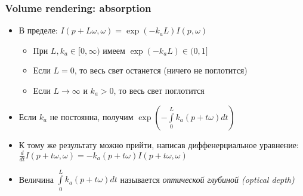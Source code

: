 \documentclass{beamer}
\begin{document}
\begin{frame}[fragile]
\frametitle{Volume rendering: absorption}
\begin{itemize}
\item В пределе: \begin{math}I(p + L\omega, \omega) = \exp(- k_a L) I(p, \omega)\end{math}
\pause
\begin{itemize}
\item При \begin{math}L, k_a \in [0, \infty)\end{math} имеем \begin{math}\exp(-k_a L) \in (0, 1]\end{math}
\item Если \begin{math}L = 0\end{math}, то весь свет останется (ничего не поглотится)
\item Если \begin{math}L \rightarrow \infty\end{math} и \begin{math}k_a > 0\end{math}, то весь свет поглотится
\end{itemize}
\pause
\item Если \begin{math}k_a\end{math} не постоянна, получим \begin{math}\exp\left(-\int\limits_0^L k_a(p+t\omega)dt\right)\end{math}
\pause
\item К тому же результату можно прийти, написав диффенерциальное уравнение: \begin{math}\frac{d}{dt}I(p+t\omega,\omega) = -k_a(p+t\omega) I(p+t\omega,\omega)\end{math}
\pause
\item Величина \begin{math}\int\limits_0^L k_a(p+t\omega)dt\end{math} называется \textit{оптической глубиной (optical depth)}
\end{itemize}
\end{frame}
\end{document}

